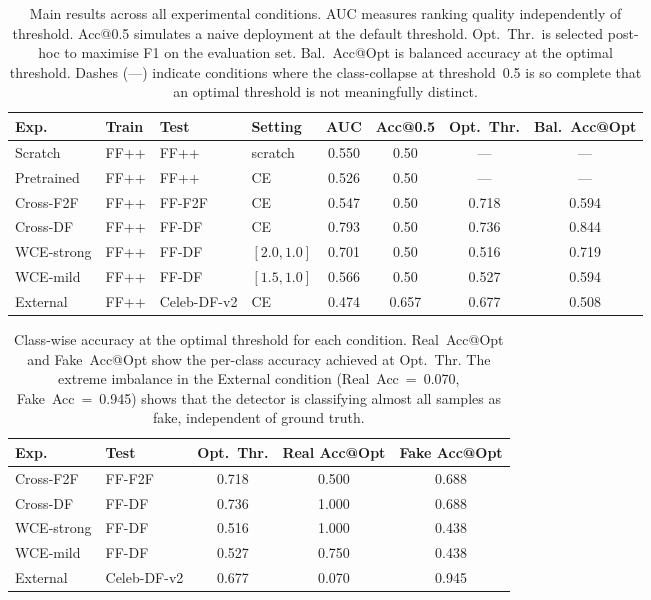 \documentclass[a4paper,12pt]{report}
\begin{document}
\begin{table}[htbp]
\centering
\caption{%
  Main results across all experimental conditions.
  AUC measures ranking quality independently of threshold.
  Acc@0.5 simulates a naive deployment at the default
  threshold.
  Opt.~Thr.\ is selected post-hoc to maximise F1 on
  the evaluation set.
  Bal.~Acc@Opt is balanced accuracy at the optimal
  threshold.
  Dashes (---) indicate conditions where the class-collapse
  at threshold~0.5 is so complete that an optimal threshold
  is not meaningfully distinct.
}
\label{tab:main}
\small
\begin{tabular}{@{}llllcccc@{}}
\toprule
\textbf{Exp.} & \textbf{Train} & \textbf{Test}
  & \textbf{Setting}
  & \textbf{AUC}
  & \textbf{Acc@0.5}
  & \textbf{Opt.~Thr.}
  & \textbf{Bal.~Acc@Opt} \\
\midrule
Scratch    & FF++ & FF++       & scratch     & 0.550 & 0.50 & ---   & --- \\
Pretrained & FF++ & FF++       & CE          & 0.526 & 0.50 & ---   & --- \\
\addlinespace
Cross-F2F  & FF++ & FF-F2F     & CE          & 0.547 & 0.50 & 0.718 & 0.594 \\
Cross-DF   & FF++ & FF-DF      & CE          & 0.793 & 0.50 & 0.736 & 0.844 \\
\addlinespace
WCE-strong & FF++ & FF-DF      & $[2.0,1.0]$ & 0.701 & 0.50 & 0.516 & 0.719 \\
WCE-mild   & FF++ & FF-DF      & $[1.5,1.0]$ & 0.566 & 0.50 & 0.527 & 0.594 \\
\addlinespace
External   & FF++ & Celeb-DF-v2& CE          & 0.474 & 0.657 & 0.677 & 0.508 \\
\bottomrule
\end{tabular}
\end{table}

\begin{table}[htbp]
\centering
\caption{%
  Class-wise accuracy at the optimal threshold for each
  condition.
  Real~Acc@Opt and Fake~Acc@Opt show the per-class
  accuracy achieved at Opt.~Thr.
  The extreme imbalance in the External condition
  (Real~Acc~=~0.070, Fake~Acc~=~0.945) shows that the
  detector is classifying almost all samples as fake,
  independent of ground truth.
}
\label{tab:classwise}
\small
\begin{tabular}{@{}llccc@{}}
\toprule
\textbf{Exp.} & \textbf{Test}
  & \textbf{Opt.~Thr.}
  & \textbf{Real Acc@Opt}
  & \textbf{Fake Acc@Opt} \\
\midrule
Cross-F2F  & FF-F2F      & 0.718 & 0.500 & 0.688 \\
Cross-DF   & FF-DF       & 0.736 & 1.000 & 0.688 \\
WCE-strong & FF-DF       & 0.516 & 1.000 & 0.438 \\
WCE-mild   & FF-DF       & 0.527 & 0.750 & 0.438 \\
External   & Celeb-DF-v2 & 0.677 & 0.070 & 0.945 \\
\bottomrule
\end{tabular}
\end{table}
\end{document}
